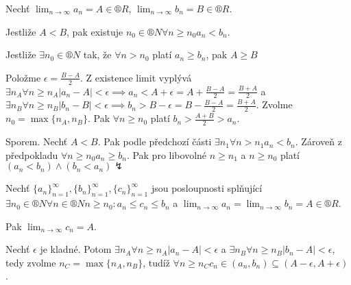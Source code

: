 \documentclass[12pt]{article}					%
\begin{document}
        \begin{veta}
            Nechť $\lim_{n \rightarrow ∞} a_n = A \in ®R$, $\lim_{n \rightarrow ∞} b_n = B \in ®R$. 

            Jestliže $A<B$, pak existuje $n_0 \in ®N \forall n≥n_0 a_n < b_n$.

            Jestliže $\exists n_0 \in ®N$ tak, že $\forall n > n_0$ platí $a_n≥b_n$, pak $A≥B$
            \begin{dukazin}
                Položme $\epsilon = \frac{B-A}{2}$. Z existence limit vyplývá $\exists n_A \forall n≥n_A |a_n - A| < \epsilon \implies a_n < A + \epsilon = A + \frac{B-A}{2} = \frac{B+A}{2}$ a $\exists n_B \forall n≥n_B |b_n - B| < \epsilon \implies b_n > B - \epsilon = B - \frac{B-A}{2} = \frac{B+A}{2}$. Zvolme $n_0 = \max\{n_A, n_B\}$. Pak $\forall n ≥ n_0$ platí $b_n > \frac{A+B}{2} > a_n$.
                
                Sporem. Nechť $A<B$. Pak podle předchozí části $\exists n_1 \forall n>n_1 a_n < b_n$. Zároveň z předpokladu $\forall n≥n_0 a_n≥b_n$. Pak pro libovolné $n≥n_1$ a $n≥n_0$ platí $(a_n<b_n) \land (b_n<a_n) \lightning$
            \end{dukazin}
        \end{veta}

        \begin{veta}
            Nechť $\{a_n\}_{n = 1}^∞, \{b_n\}_{n = 1}^∞, \{c_n\}_{n = 1}^∞$ jsou posloupnosti splňující $\exists n_0 \in ®N \forall n \in ®N n≥n_0: a_n ≤ c_n ≤ b_n$ a $\lim_{n \rightarrow ∞} a_n = \lim_{n \rightarrow ∞} b_n = A \in ®R$.

            Pak $\lim_{n \rightarrow ∞} c_n = A$.
            

            \begin{dukazin}
                Nechť $\epsilon$ je kladné. Potom $\exists n_A \forall n≥n_A |a_n - A| < \epsilon$ a $\exists n_B \forall n≥n_B |b_n - A| < \epsilon$, tedy zvolme $n_C = \max\{n_A, n_B\}$, tudíž $\forall n≥n_C c_n \in (a_n, b_n) \subseteq (A-\epsilon, A+\epsilon)$.
            \end{dukazin}
        \end{veta}
\end{document}
